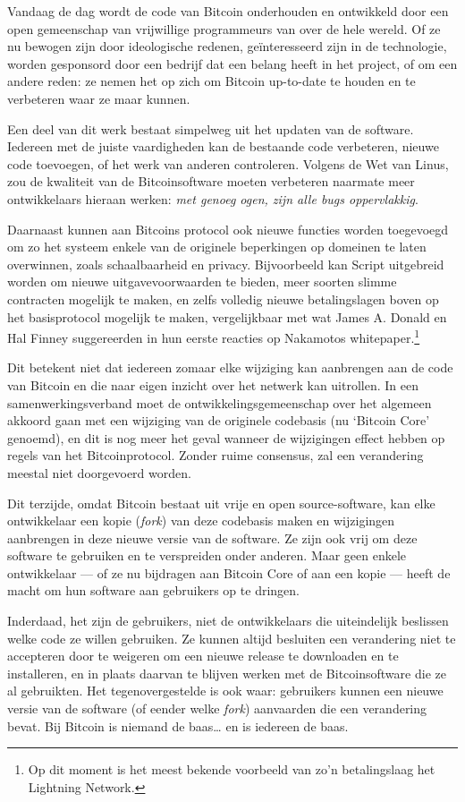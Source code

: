 \documentclass[smalldemyvopaper,11pt,twoside,onecolumn,openright,extrafontsizes,hidelinks]{memoir}
\begin{document}
Vandaag de dag wordt de code van Bitcoin onderhouden en ontwikkeld door
een open gemeenschap van vrijwillige programmeurs van over de hele
wereld. Of ze nu bewogen zijn door ideologische redenen, geïnteresseerd
zijn in de technologie, worden gesponsord door een bedrijf dat een
belang heeft in het project, of om een andere reden: ze nemen het op
zich om Bitcoin up-to-date te houden en te verbeteren waar ze maar
kunnen.

Een deel van dit werk bestaat simpelweg uit het updaten van de software.
Iedereen met de juiste vaardigheden kan de bestaande code verbeteren,
nieuwe code toevoegen, of het werk van anderen controleren. Volgens de
Wet van Linus, zou de kwaliteit van de Bitcoinsoftware moeten verbeteren
naarmate meer ontwikkelaars hieraan werken: \emph{met genoeg ogen, zijn
alle bugs oppervlakkig}.

Daarnaast kunnen aan Bitcoins protocol ook nieuwe functies worden
toegevoegd om zo het systeem enkele van de originele beperkingen op
domeinen te laten overwinnen, zoals schaalbaarheid en privacy.
Bijvoorbeeld kan Script uitgebreid worden om nieuwe uitgavevoorwaarden
te bieden, meer soorten slimme contracten mogelijk te maken, en zelfs
volledig nieuwe betalingslagen boven op het basisprotocol mogelijk te
maken, vergelijkbaar met wat James A. Donald en Hal Finney suggereerden
in hun eerste reacties op Nakamotos whitepaper.\footnote{Op dit moment
  is het meest bekende voorbeeld van zo'n betalingslaag het Lightning
  Network.}

Dit betekent niet dat iedereen zomaar elke wijziging kan aanbrengen aan
de code van Bitcoin en die naar eigen inzicht over het netwerk kan
uitrollen. In een samenwerkingsverband moet de ontwikkelingsgemeenschap
over het algemeen akkoord gaan met een wijziging van de originele
codebasis (nu `Bitcoin Core' genoemd), en dit is nog meer het geval
wanneer de wijzigingen effect hebben op regels van het Bitcoinprotocol.
Zonder ruime consensus, zal een verandering meestal niet doorgevoerd
worden.

Dit terzijde, omdat Bitcoin bestaat uit vrije en open source-software,
kan elke ontwikkelaar een kopie (\emph{fork}) van deze codebasis maken
en wijzigingen aanbrengen in deze nieuwe versie van de software. Ze zijn
ook vrij om deze software te gebruiken en te verspreiden onder anderen.
Maar geen enkele ontwikkelaar --- of ze nu bijdragen aan Bitcoin Core of
aan een kopie --- heeft de macht om hun software aan gebruikers op te
dringen.

Inderdaad, het zijn de gebruikers, niet de ontwikkelaars die
uiteindelijk beslissen welke code ze willen gebruiken. Ze kunnen altijd
besluiten een verandering niet te accepteren door te weigeren om een
nieuwe release te downloaden en te installeren, en in plaats daarvan te
blijven werken met de Bitcoinsoftware die ze al gebruikten. Het
tegenovergestelde is ook waar: gebruikers kunnen een nieuwe versie van
de software (of eender welke \emph{fork}) aanvaarden die een verandering
bevat. Bij Bitcoin is niemand de baas\ldots{} en is iedereen de baas.
\end{document}
